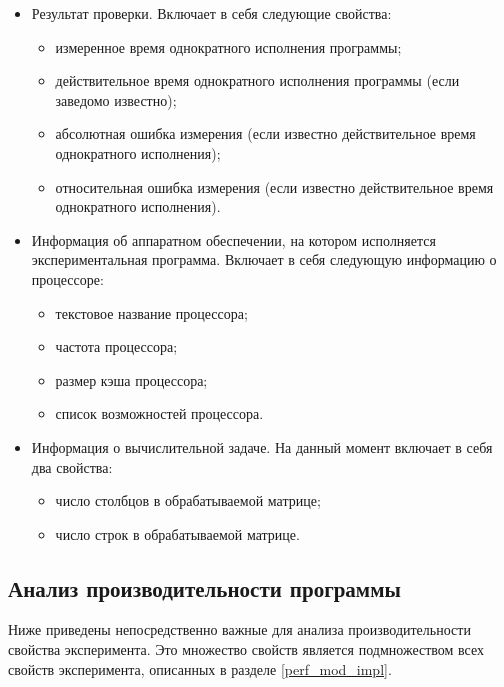 \begin{itemize}
	\item Результат проверки. Включает в себя следующие свойства:
	\begin{itemize}
		\item измеренное время однократного исполнения программы;
		\item действительное время однократного исполнения программы (если заведомо известно);
		\item абсолютная ошибка измерения (если известно действительное время однократного исполнения);
		\item относительная ошибка измерения (если известно действительное время однократного исполнения).
	\end{itemize}

	\item Информация об аппаратном обеспечении, на котором исполняется экспериментальная программа. Включает в себя следующую информацию о процессоре:
	\begin{itemize}
		\item текстовое название процессора;
		\item частота процессора;
		\item размер кэша процессора;
		\item список возможностей процессора.
	\end{itemize}

	\item Информация о вычислительной задаче. На данный момент включает в себя два свойства:
	\begin{itemize}
		\item число столбцов в обрабатываемой матрице;
		\item число строк в обрабатываемой матрице.
	\end{itemize}
\end{itemize}

\subsection{Анализ производительности программы}

Ниже приведены непосредственно важные для анализа производительности свойства эксперимента. Это множество свойств является подмножеством всех свойств эксперимента, описанных в разделе \ref{perf_mod_impl}.

